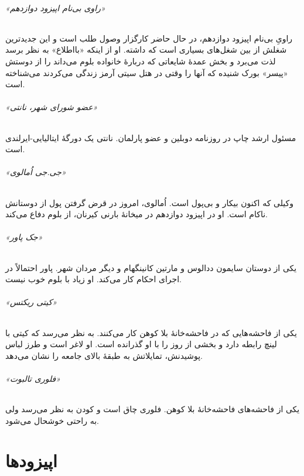 \documentclass[12pt]{book}
\newcommand{\noun}[1]{«{#1}»}
\begin{document}
    \paragraph{\noun{راوی بی‌نام اپیزود دوازدهم}}
    راویِ بی‌نام اپیزود دوازدهم، در حال حاضر کارگزار وصول طلب است و این جدیدترین شغلش از بین شغل‌های بسیاری است که داشته. او از اینکه «بااطلاع» به نظر برسد لذت می‌برد و بخش عمدۀ شایعاتی که دربارۀ خانواده بلوم می‌داند را از دوستش «پیسر» بورک شنیده که آنها را وقتی در هتل سیتی آرمز زندگی می‌کردند می‌شناخته است.
    \paragraph{\noun{عضو شورای شهر، نانتی}\protect{}}
    مسئول ارشد چاپ در روزنامه دوبلین و عضو پارلمان. نانتی یک دورگۀ ایتالیایی-ایرلندی است.
    \paragraph{\noun{جی.جی اُمالوی}\protect{}}
    وکیلی که اکنون بیکار و بی‌پول است. اُمالوی، امروز در قرض گرفتن پول از دوستانش ناکام است. او در اپیزود دوازدهم در میخانۀ بارنی کیرنان، از بلوم دفاع می‌کند.
    \paragraph{\noun{جک پاور}\protect{}}
    یکی از دوستان سایمون ددالوس و مارتین کانینگهام و دیگر مردان شهر. پاور احتمالاً در اجرای احکام کار می‌کند. او زیاد با بلوم خوب نیست.
    \paragraph{\noun{کیتی ریکتس}\protect{}}
    یکی از فاحشه‌هایی که در فاحشه‌خانۀ بلا کوهن کار می‌کنند. به نظر می‌رسد که کیتی با لینچ رابطه دارد و بخشی از روز را با او گذرانده است. او لاغر است و طرز لباس پوشیدنش، تمایلاتش به طبقۀ بالای جامعه را نشان می‌دهد.
    \paragraph{\noun{فلوری تالبوت}\protect{}}
    یکی از فاحشه‌های فاحشه‌خانۀ بلا کوهن. فلوری چاق است و کودن به نظر می‌رسد ولی به راحتی خوشحال می‌شود.

    \part{اپیزودها}
\end{document}

